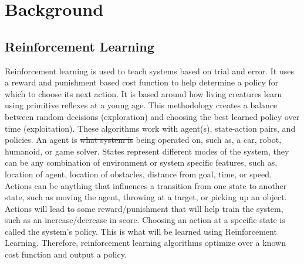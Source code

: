 \documentclass[12pt,american]{report}
\providecommand{\DIFaddtex}[1]{{\protect\color{blue}\uwave{#1}}} %
\providecommand{\DIFdeltex}[1]{{\protect\color{red}\sout{#1}}}                      %
\providecommand{\DIFaddbegin}{} %
\providecommand{\DIFaddend}{} %
\providecommand{\DIFdelbegin}{} %
\providecommand{\DIFdelend}{} %
\providecommand{\DIFadd}[1]{\texorpdfstring{\DIFaddtex{#1}}{#1}} %
\providecommand{\DIFdel}[1]{\texorpdfstring{\DIFdeltex{#1}}{}} %
\newcommand{\DIFscaledelfig}{0.5}
\newlength{\DIFdelgraphicswidth} %
\newlength{\DIFdelgraphicsheight} %
\newcommand{\DIFaddincludegraphics}[2][]{{\color{blue}\fbox{\DIFOincludegraphics[#1]{#2}}}} %
\newcommand{\DIFdelincludegraphics}[2][]{%
\sbox{\DIFdelgraphicsbox}{\DIFOincludegraphics[#1]{#2}}%
\settoboxwidth{\DIFdelgraphicswidth}{\DIFdelgraphicsbox} %
\settoboxtotalheight{\DIFdelgraphicsheight}{\DIFdelgraphicsbox} %
\scalebox{\DIFscaledelfig}{%
\parbox[b]{\DIFdelgraphicswidth}{\usebox{\DIFdelgraphicsbox}\\[-\baselineskip] \rule{\DIFdelgraphicswidth}{0em}}\llap{\resizebox{\DIFdelgraphicswidth}{\DIFdelgraphicsheight}{%
\setlength{\unitlength}{\DIFdelgraphicswidth}%
\begin{picture}(1,1)%
\thicklines\linethickness{2pt} %
{\color[rgb]{1,0,0}\put(0,0){\framebox(1,1){}}}%
{\color[rgb]{1,0,0}\put(0,0){\line( 1,1){1}}}%
{\color[rgb]{1,0,0}\put(0,1){\line(1,-1){1}}}%
\end{picture}%
}\hspace*{3pt}}} %
} %
\DeclareRobustCommand{\DIFaddbegin}{\DIFOaddbegin \let\includegraphics\DIFaddincludegraphics} %
\DeclareRobustCommand{\DIFaddend}{\DIFOaddend \let\includegraphics\DIFOincludegraphics} %
\DeclareRobustCommand{\DIFdelbegin}{\DIFOdelbegin \let\includegraphics\DIFdelincludegraphics} %
\DeclareRobustCommand{\DIFdelend}{\DIFOaddend \let\includegraphics\DIFOincludegraphics} %
\begin{document}
\chapter{Background}
\label{sec:background}

\section{Reinforcement Learning}
Reinforcement learning is used to teach systems based on trial and error.  It uses a reward and punishment based cost function to help determine a policy for which to choose its next action.  It is based around how living creatures learn using primitive reflexes at a young age. This methodology creates a balance between random decisions (exploration) and choosing the best learned policy over time (exploitation). These algorithms work with agent(s), state-action pairs, and policies. An agent is \DIFdelbegin \DIFdel{what system is }\DIFdelend \DIFaddbegin \DIFadd{the system }\DIFaddend being operated on, such as, a car, robot, humanoid, or game solver. States represent different modes of the system, they can be any combination of environment or system specific features, such as, location of agent, location of obstacles, distance from goal, time, or speed. Actions can be anything that influences a transition from one state to another state, such as moving the agent, throwing at a target, or picking up an object.  Actions will lead to some reward/punishment that will help train the system, such as an increase/decrease in score.  Choosing an action at a specific state is called the system's policy. This is what will be learned using Reinforcement Learning.  Therefore, reinforcement learning algorithms optimize over a known cost function and output a policy.
\end{document}
